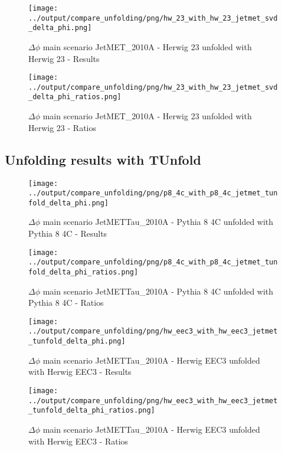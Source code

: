 \documentclass[11pt]{book}
\begin{document}
\begin{figure}[ht]
\centering
\texttt{[image: ../output/compare\_unfolding/png/hw\_23\_with\_hw\_23\_jetmet\_svd\_delta\_phi.png]}
\caption{$\Delta\phi$ main scenario JetMET\_2010A - Herwig 23 unfolded with Herwig 23 - Results}
\label{hw_23_hw_23_jetmet_svd_delta_phi_a}
\end{figure}

\begin{figure}[ht]
\centering
\texttt{[image: ../output/compare\_unfolding/png/hw\_23\_with\_hw\_23\_jetmet\_svd\_delta\_phi\_ratios.png]}
\caption{$\Delta\phi$ main scenario JetMET\_2010A - Herwig 23 unfolded with Herwig 23 - Ratios}
\label{hw_23_jetmet_svd_delta_phi_b}
\end{figure}


\clearpage
\subsection{Unfolding results with TUnfold}

\begin{figure}[ht]
\centering
\texttt{[image: ../output/compare\_unfolding/png/p8\_4c\_with\_p8\_4c\_jetmet\_tunfold\_delta\_phi.png]}
\caption{$\Delta\phi$ main scenario JetMETTau\_2010A - Pythia 8 4C unfolded with Pythia 8 4C - Results}
\label{p8_p8_jetmet_tunfold_delta_phi_a}
\end{figure}

\begin{figure}[ht]
\centering
\texttt{[image: ../output/compare\_unfolding/png/p8\_4c\_with\_p8\_4c\_jetmet\_tunfold\_delta\_phi\_ratios.png]}
\caption{$\Delta\phi$ main scenario JetMETTau\_2010A - Pythia 8 4C unfolded with Pythia 8 4C - Ratios}
\label{p8_p8_jetmet_tunfold_delta_phi_b}
\end{figure}

\begin{figure}[ht]
\centering
\texttt{[image: ../output/compare\_unfolding/png/hw\_eec3\_with\_hw\_eec3\_jetmet\_tunfold\_delta\_phi.png]}
\caption{$\Delta\phi$ main scenario JetMETTau\_2010A - Herwig EEC3 unfolded with Herwig EEC3 - Results}
\label{hw_eec3_hw_eec3_jetmet_tunfold_delta_phi_a}
\end{figure}

\begin{figure}[ht]
\centering
\texttt{[image: ../output/compare\_unfolding/png/hw\_eec3\_with\_hw\_eec3\_jetmet\_tunfold\_delta\_phi\_ratios.png]}
\caption{$\Delta\phi$ main scenario JetMETTau\_2010A - Herwig EEC3 unfolded with Herwig EEC3 - Ratios}
\label{hw_eec3_jetmet_tunfold_delta_phi_b}
\end{figure}
\end{document}
